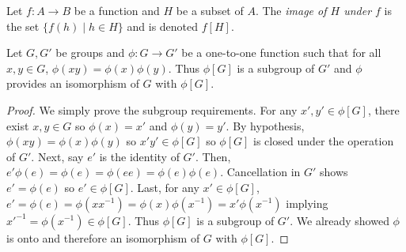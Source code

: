 \begin{definition}
    Let $f\colon A\to B$ be a function and $H$ be a subset of $A$. The \emph{image of $H$ under $f$} is the set $\{f(h) \mid h \in H\}$ and is denoted $f[H].$
\end{definition}
\begin{lemma}
    Let $G, G'$ be groups and $\phi\colon G\to G'$ be a one-to-one function such that for all $x,y \in G$, $\phi(xy) = \phi(x)\phi(y).$ Thus $\phi[G]$ is a subgroup of $G'$ and $\phi$ provides an isomorphism of $G$ with $\phi[G]$.
\end{lemma}
\begin{proof}
    We simply prove the subgroup requirements. For any $x', y' \in \phi[G]$, there exist $x,y \in G$ so $\phi(x)=x'$ and $\phi(y)=y'$. By hypothesis, $\phi(xy) = \phi(x)\phi(y)$ so $x'y' \in \phi[G]$ so $\phi[G]$ is closed under the operation of $G'$. Next, say $e'$ is the identity of $G'$. Then, $e'\phi(e) = \phi(e) = \phi(ee) = \phi(e)\phi(e)$. Cancellation in $G'$ shows $e'=\phi(e)$ so $e' \in \phi[G]$. Last, for any $x' \in \phi[G]$, $e'=\phi(e)=\phi(xx^{-1})=\phi(x)\phi(x^{-1})=x'\phi(x^{-1})$ implying $x'^{-1} = \phi(x^{-1}) \in \phi[G]$. Thus $\phi[G]$ is a subgroup of $G'$. We already showed $\phi$ is onto and therefore an isomorphism of $G$ with $\phi[G]$.
\end{proof}
\begin{theorem}
    
\end{theorem}





